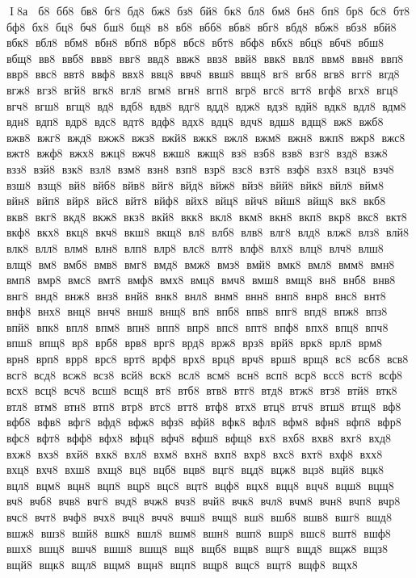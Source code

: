 I 8а   б8  бб8  бв8  бг8  бд8  бж8  бз8  бй8  бк8  бл8  бм8  бн8  бп8  бр8  бс8  бт8  бф8  бх8  бц8  бч8  бш8  бщ8  в8  вб8  вбб8  вбв8  вбг8  вбд8  вбж8  вбз8  вбй8  вбк8  вбл8  вбм8  вбн8  вбп8  вбр8  вбс8  вбт8  вбф8  вбх8  вбц8  вбч8  вбш8  вбщ8  вв8  ввб8  ввв8  ввг8  ввд8  ввж8  ввз8  ввй8  ввк8  ввл8  ввм8  ввн8  ввп8  ввр8  ввс8  ввт8  ввф8  ввх8  ввц8  ввч8  ввш8  ввщ8  вг8  вгб8  вгв8  вгг8  вгд8  вгж8  вгз8  вгй8  вгк8  вгл8  вгм8  вгн8  вгп8  вгр8  вгс8  вгт8  вгф8  вгх8  вгц8  вгч8  вгш8  вгщ8  вд8  вдб8  вдв8  вдг8  вдд8  вдж8  вдз8  вдй8  вдк8  вдл8  вдм8  вдн8  вдп8  вдр8  вдс8  вдт8  вдф8  вдх8  вдц8  вдч8  вдш8  вдщ8  вж8  вжб8  вжв8  вжг8  вжд8  вжж8  вжз8  вжй8  вжк8  вжл8  вжм8  вжн8  вжп8  вжр8  вжс8  вжт8  вжф8  вжх8  вжц8  вжч8  вжш8  вжщ8  вз8  взб8  взв8  взг8  взд8  взж8  взз8  взй8  взк8  взл8  взм8  взн8  взп8  взр8  взс8  взт8  взф8  взх8  взц8  взч8  взш8  взщ8  вй8  вйб8  вйв8  вйг8  вйд8  вйж8  вйз8  вйй8  вйк8  вйл8  вйм8  вйн8  вйп8  вйр8  вйс8  вйт8  вйф8  вйх8  вйц8  вйч8  вйш8  вйщ8  вк8  вкб8  вкв8  вкг8  вкд8  вкж8  вкз8  вкй8  вкк8  вкл8  вкм8  вкн8  вкп8  вкр8  вкс8  вкт8  вкф8  вкх8  вкц8  вкч8  вкш8  вкщ8  вл8  влб8  влв8  влг8  влд8  влж8  влз8  влй8  влк8  влл8  влм8  влн8  влп8  влр8  влс8  влт8  влф8  влх8  влц8  влч8  влш8  влщ8  вм8  вмб8  вмв8  вмг8  вмд8  вмж8  вмз8  вмй8  вмк8  вмл8  вмм8  вмн8  вмп8  вмр8  вмс8  вмт8  вмф8  вмх8  вмц8  вмч8  вмш8  вмщ8  вн8  внб8  внв8  внг8  внд8  внж8  внз8  внй8  внк8  внл8  внм8  внн8  внп8  внр8  внс8  внт8  внф8  внх8  внц8  внч8  внш8  внщ8  вп8  впб8  впв8  впг8  впд8  впж8  впз8  впй8  впк8  впл8  впм8  впн8  впп8  впр8  впс8  впт8  впф8  впх8  впц8  впч8  впш8  впщ8  вр8  врб8  врв8  врг8  врд8  врж8  врз8  врй8  врк8  врл8  врм8  врн8  врп8  врр8  врс8  врт8  врф8  врх8  врц8  врч8  врш8  врщ8  вс8  всб8  всв8  всг8  всд8  всж8  всз8  всй8  вск8  всл8  всм8  всн8  всп8  вср8  всс8  вст8  всф8  всх8  всц8  всч8  всш8  всщ8  вт8  втб8  втв8  втг8  втд8  втж8  втз8  втй8  втк8  втл8  втм8  втн8  втп8  втр8  втс8  втт8  втф8  втх8  втц8  втч8  втш8  втщ8  вф8  вфб8  вфв8  вфг8  вфд8  вфж8  вфз8  вфй8  вфк8  вфл8  вфм8  вфн8  вфп8  вфр8  вфс8  вфт8  вфф8  вфх8  вфц8  вфч8  вфш8  вфщ8  вх8  вхб8  вхв8  вхг8  вхд8  вхж8  вхз8  вхй8  вхк8  вхл8  вхм8  вхн8  вхп8  вхр8  вхс8  вхт8  вхф8  вхх8  вхц8  вхч8  вхш8  вхщ8  вц8  вцб8  вцв8  вцг8  вцд8  вцж8  вцз8  вцй8  вцк8  вцл8  вцм8  вцн8  вцп8  вцр8  вцс8  вцт8  вцф8  вцх8  вцц8  вцч8  вцш8  вцщ8  вч8  вчб8  вчв8  вчг8  вчд8  вчж8  вчз8  вчй8  вчк8  вчл8  вчм8  вчн8  вчп8  вчр8  вчс8  вчт8  вчф8  вчх8  вчц8  вчч8  вчш8  вчщ8  вш8  вшб8  вшв8  вшг8  вшд8  вшж8  вшз8  вшй8  вшк8  вшл8  вшм8  вшн8  вшп8  вшр8  вшс8  вшт8  вшф8  вшх8  вшц8  вшч8  вшш8  вшщ8  вщ8  вщб8  вщв8  вщг8  вщд8  вщж8  вщз8  вщй8  вщк8  вщл8  вщм8  вщн8  вщп8  вщр8  вщс8  вщт8  вщф8  вщх8  